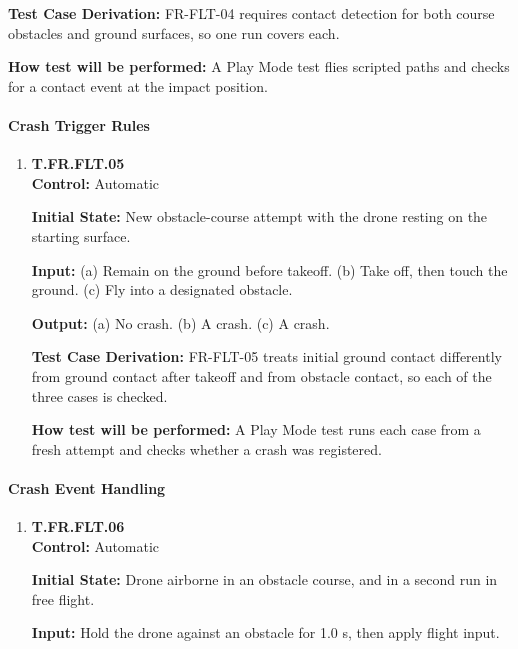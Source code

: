 \documentclass[12pt, titlepage]{article}
\begin{document}
{\begin{enumerate}
\textbf{Test Case Derivation:} \mbox{FR-FLT-04} requires contact detection for both
course obstacles and ground surfaces, so one run covers each.

\textbf{How test will be performed:} A Play Mode test flies scripted paths and checks
for a contact event at the impact position.

\end{enumerate}

\paragraph{Crash Trigger Rules}

\begin{enumerate}

\item{\hypertarget{test-fr-fl05}{}\textbf{T.FR.FLT.05}\\}
\textbf{Control:} Automatic

\textbf{Initial State:} New obstacle-course attempt with the drone resting on the
starting surface.

\textbf{Input:} (a) Remain on the ground before takeoff. (b) Take off, then touch the
ground. (c) Fly into a designated obstacle.

\textbf{Output:} (a) No crash. (b) A crash. (c) A crash.

\textbf{Test Case Derivation:} \mbox{FR-FLT-05} treats initial ground contact
differently from ground contact after takeoff and from obstacle contact, so each of the
three cases is checked.

\textbf{How test will be performed:} A Play Mode test runs each case from a fresh
attempt and checks whether a crash was registered.

\end{enumerate}

\paragraph{Crash Event Handling}

\begin{enumerate}

\item{\hypertarget{test-fr-fl06}{}\textbf{T.FR.FLT.06}\\}
\textbf{Control:} Automatic

\textbf{Initial State:} Drone airborne in an obstacle course, and in a second run in
free flight.

\textbf{Input:} Hold the drone against an obstacle for 1.0 s, then apply flight input.


\end{enumerate}}
\end{document}
